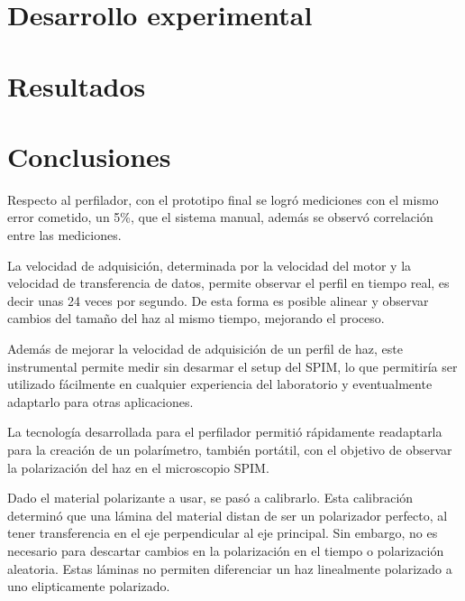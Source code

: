 \documentclass[12pt,a4paper]{article}
\begin{document}
    \section{Desarrollo experimental}
        

    \section{Resultados}
        
    \section{Conclusiones}
        Respecto al perfilador, con el prototipo final se logró mediciones con el mismo error cometido, un 5\%, que el sistema manual, además se observó correlación entre las mediciones. 

        La velocidad de adquisición, determinada por la velocidad del motor y la velocidad de transferencia de datos, permite observar el perfil en tiempo real, es decir unas 24 veces por segundo. De esta forma es posible alinear y observar cambios del tamaño del haz al mismo tiempo, mejorando el proceso.

        Además de mejorar la velocidad de adquisición de un perfil de haz, este instrumental permite medir sin desarmar el setup del SPIM, lo que permitiría ser utilizado fácilmente en cualquier experiencia del laboratorio y eventualmente adaptarlo para otras aplicaciones.

        La tecnología desarrollada para el perfilador permitió rápidamente readaptarla para la creación de un polarímetro, también portátil, con el objetivo de observar la polarización del haz en el microscopio SPIM.
        
        Dado el material polarizante a usar, se pasó a calibrarlo. Esta calibración determinó que una lámina del material distan de ser un polarizador perfecto, al tener transferencia en el eje perpendicular al eje principal. Sin embargo, no es necesario para descartar cambios en la polarización en el tiempo o polarización aleatoria. Estas láminas no permiten diferenciar un haz linealmente polarizado a uno elipticamente polarizado. 
\end{document}
